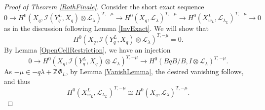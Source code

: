 \documentclass[12pt,reqno]{amsart}
\newtheorem{lemma}[theorem]{Lemma}
\theoremstyle{definition}
\begin{document}
\begin{proof}[Proof of Theorem \ref{RothFinale}]
Consider the short exact sequence 
$$
0 \to H^0(X_{q}, \mathscr{I}(Y^L_{q}, X_{q})\otimes \mathscr{L}_\lambda)^{T, -\mu} \to H^0(X_{q}, \mathscr{L}_\lambda)^{T, -\mu} \to H^0(X^L_{w_L}, \mathscr{L}_{\lambda_L})^{T,-\mu} \to 0
$$
as in the discussion following Lemma \ref{InvExact}. We will show that 
$$
H^0(X_{q}, \mathscr{I}(Y^L_{q}, X_{q})\otimes \mathscr{L}_\lambda)^{T, -\mu} = 0.
$$
By Lemma \ref{OpenCellRestriction}, we have an injection 
$$
0 \rightarrow H^0(X_{q}, \mathscr{I}(Y^L_{q}, X_{q})\otimes \mathscr{L}_\lambda)^{T, -\mu}  \rightarrow H^0(BqB/B, I \otimes \mathscr{L}_\lambda )^{T, -\mu} .
$$
As $-\mu \in -q\lambda +\mathbb{Z}\Phi_L$, by Lemma \ref{VanishLemma}, the desired vanishing follows, and thus 
$$
 H^0(X^L_{w_L}, \mathscr{L}_{\lambda_L})^{T, -\mu} \cong H^0(X_q, \mathscr{L}_\lambda)^{T, -\mu}.
$$

\end{proof}


%
%
%
%
%
\end{document}
